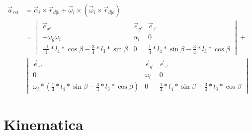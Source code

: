 \documentclass[a4paper,10pt]{article}
\begin{document}
\begin{equation}
	\begin{aligned}
	\vec{a}_{rel} &= \vec{\alpha}_i \times \vec{r}_{d|b} + \vec{\omega}_i \times(\vec{\omega}_i \times \vec{r}_{d|b})\\
	&= \begin{vmatrix}
	\vec{e}_{x'} & \vec{e}_{y'} & \vec{e}_{z'}\\
	-\omega_g\omega_i & \alpha_i & 0 \\
	\frac{-1}{4}*l_4*\cos{\beta} - \frac{3}{4}*l_3 * \sin{\beta} & 0 &\frac{1}{4}*l_4 *\sin{\beta}-\frac{3}{4}*l_3 * \cos{\beta}
	\end{vmatrix} + \\
	&\begin{vmatrix}
	\vec{e}_{x'} & \vec{e}_{y'} & \vec{e}_{z'}\\
	0 & \omega_i & 0 \\
	\omega_i * (\frac{1}{4}*l_4 *\sin{\beta}-\frac{3}{4}*l_3 * \cos{\beta}) & 0 &\frac{1}{4}*l_4 *\sin{\beta}-\frac{3}{4}*l_3 * \cos{\beta}
	\end{vmatrix}
	\end{aligned}
\end{equation}


\section{Kinematica}
\end{document}
